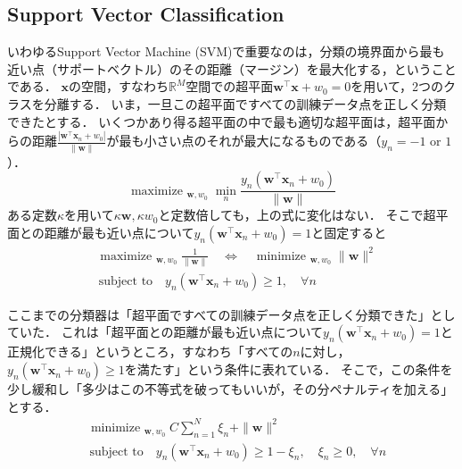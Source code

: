 \documentclass[a4paper,lualatex,ja=standard,oneside,fleqn]{bxjsarticle}
\DeclareMathOperator*{\minimize}{minimize\ }
\DeclareMathOperator*{\maximize}{maximize\ }
\begin{document}
\subsection{Support Vector Classification}
いわゆるSupport Vector Machine (SVM)で重要なのは，分類の境界面から最も近い点（サポートベクトル）のその距離（マージン）を最大化する，ということである．
$\bm{x}$の空間，すなわち$\mathbb{R}^M$空間での超平面$\bm{w}^\top\bm{x}+w_0=0$を用いて，2つのクラスを分離する．
いま，一旦この超平面ですべての訓練データ点を正しく分類できたとする．
いくつかあり得る超平面の中で最も適切な超平面は，超平面からの距離$\frac{|\bm{w}^\top\bm{x}_n+w_0|}{\|\bm{w}\|}$が最も小さい点のそれが最大になるものである（$y_n=-1$ or $1$）．
\begin{equation*}
  \maximize_{\bm{w},w_0} \min_{n} \frac{y_n(\bm{w}^\top\bm{x}_n+w_0)}{\|\bm{w}\|}
\end{equation*}
ある定数$\kappa$を用いて$\kappa\bm{w},\kappa w_0$と定数倍しても，上の式に変化はない．
そこで超平面との距離が最も近い点について$y_n(\bm{w}^\top\bm{x}_n+w_0)=1$と固定すると
\begin{align*}
  &\maximize_{\bm{w},w_0} \frac{1}{\|\bm{w}\|}\quad \iff\quad\minimize_{\bm{w},w_0} \|\bm{w}\|^2\\
  &\,\text{subject to}\quad y_n(\bm{w}^\top\bm{x}_n+w_0)\geq 1,\quad \forall n
\end{align*}

ここまでの分類器は「超平面ですべての訓練データ点を正しく分類できた」としていた．
これは「超平面との距離が最も近い点について$y_n(\bm{w}^\top\bm{x}_n+w_0)=1$と正規化できる」というところ，すなわち「すべての$n$に対し，$y_n(\bm{w}^\top\bm{x}_n+w_0)\geq1$を満たす」という条件に表れている．
そこで，この条件を少し緩和し「多少はこの不等式を破ってもいいが，その分ペナルティを加える」とする．
\begin{align*}
  &\minimize_{\bm{w},w_0} C\sum_{n=1}^N \xi_n + \|\bm{w}\|^2\\
  &\,\text{subject to}\quad y_n(\bm{w}^\top\bm{x}_n+w_0)\geq 1-\xi_n,\quad \xi_n\geq 0,\quad \forall n
\end{align*}
\end{document}
